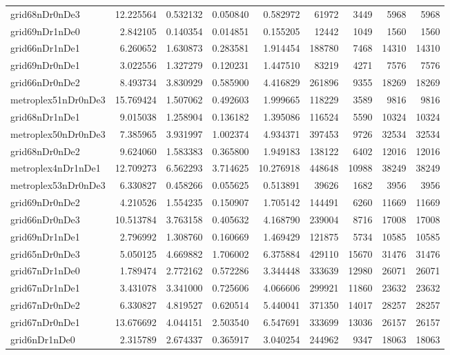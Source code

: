 \begin{longtable}{|l|r|r|r|r|r|r|r|r|}
grid68nDr0nDe3 & 12.225564 & 0.532132 & 0.050840 & 0.582972 & 61972 & 3449 & 5968 & 5968 \\
grid69nDr1nDe0 & 2.842105 & 0.140354 & 0.014851 & 0.155205 & 12442 & 1049 & 1560 & 1560 \\
grid66nDr1nDe1 & 6.260652 & 1.630873 & 0.283581 & 1.914454 & 188780 & 7468 & 14310 & 14310 \\
grid69nDr0nDe1 & 3.022556 & 1.327279 & 0.120231 & 1.447510 & 83219 & 4271 & 7576 & 7576 \\
grid66nDr0nDe2 & 8.493734 & 3.830929 & 0.585900 & 4.416829 & 261896 & 9355 & 18269 & 18269 \\
metroplex51nDr0nDe3 & 15.769424 & 1.507062 & 0.492603 & 1.999665 & 118229 & 3589 & 9816 & 9816 \\
grid68nDr1nDe1 & 9.015038 & 1.258904 & 0.136182 & 1.395086 & 116524 & 5590 & 10324 & 10324 \\
metroplex50nDr0nDe3 & 7.385965 & 3.931997 & 1.002374 & 4.934371 & 397453 & 9726 & 32534 & 32534 \\
grid68nDr0nDe2 & 9.624060 & 1.583383 & 0.365800 & 1.949183 & 138122 & 6402 & 12016 & 12016 \\
metroplex4nDr1nDe1 & 12.709273 & 6.562293 & 3.714625 & 10.276918 & 448648 & 10988 & 38249 & 38249 \\
metroplex53nDr0nDe3 & 6.330827 & 0.458266 & 0.055625 & 0.513891 & 39626 & 1682 & 3956 & 3956 \\
grid69nDr0nDe2 & 4.210526 & 1.554235 & 0.150907 & 1.705142 & 144491 & 6260 & 11669 & 11669 \\
grid66nDr0nDe3 & 10.513784 & 3.763158 & 0.405632 & 4.168790 & 239004 & 8716 & 17008 & 17008 \\
grid69nDr1nDe1 & 2.796992 & 1.308760 & 0.160669 & 1.469429 & 121875 & 5734 & 10585 & 10585 \\
grid65nDr0nDe3 & 5.050125 & 4.669882 & 1.706002 & 6.375884 & 429110 & 15670 & 31476 & 31476 \\
grid67nDr1nDe0 & 1.789474 & 2.772162 & 0.572286 & 3.344448 & 333639 & 12980 & 26071 & 26071 \\
grid67nDr1nDe1 & 3.431078 & 3.341000 & 0.725606 & 4.066606 & 299921 & 11860 & 23632 & 23632 \\
grid67nDr0nDe2 & 6.330827 & 4.819527 & 0.620514 & 5.440041 & 371350 & 14017 & 28257 & 28257 \\
grid67nDr0nDe1 & 13.676692 & 4.044151 & 2.503540 & 6.547691 & 333699 & 13036 & 26157 & 26157 \\
grid6nDr1nDe0 & 2.315789 & 2.674337 & 0.365917 & 3.040254 & 244962 & 9347 & 18063 & 18063 \\

\end{longtable}
